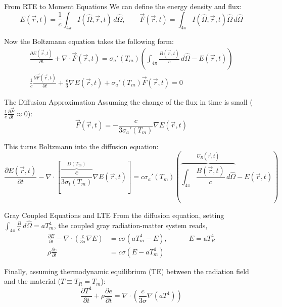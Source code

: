 \documentclass[xcolor=table]{beamer}
\begin{document}
\begin{frame}{From RTE to Moment Equations}
    We can define the energy density and flux:
    \begin{equation*}
        E(\vec{r},t) = \frac{1}{c}\int_{4\pi} I(\hat{\Omega}, \vec{r}, t) \, d\hat{\Omega}, \qquad \vec{F}(\vec{r},t) = \int_{4\pi} I(\hat{\Omega}, \vec{r}, t)\hat{\Omega} \, d\hat{\Omega}
    \end{equation*}

    Now the Boltzmann equation takes the following form:
    \begin{gather*}
        \frac{\partial E(\vec{r},t)}{\partial t} + \nabla \cdot \vec{F}(\vec{r},t) = \sigma_a'(T_m)\left(\int_{4\pi} \frac{B(\vec{r},t)}{c} \, d\hat{\Omega} - E(\vec{r},t)\right) \\[8pt]
        \frac{1}{c}\frac{\partial \vec{F}(\vec{r},t)}{\partial t} + \frac{c}{3} \nabla E(\vec{r},t) + \sigma_a'(T_m)\vec{F}(\vec{r},t) = 0
    \end{gather*}
\end{frame}

\begin{frame}{The Diffusion Approximation}
    Assuming the change of the flux in time is small ($\frac{1}{c}\frac{\partial \vec{F}}{\partial t} \approx 0$):
    \begin{equation*}
        \vec{F}(\vec{r},t) = -\frac{c}{3\sigma_a'(T_m)} \nabla E(\vec{r},t)
    \end{equation*}

    \vspace{0.3cm}
    This turns Boltzmann into the diffusion equation:
    \begin{equation*}
        \frac{\partial E(\vec{r},t)}{\partial t} - \nabla \cdot \left[\overbrace{\frac{c}{3\sigma_t(T_m)}}^{D(T_m)} \nabla E(\vec{r},t)\right] = c\sigma_a'(T_m)\left(\overbrace{\int_{4\pi} \frac{B(\vec{r},t)}{c} \, d\hat{\Omega}}^{U_R(\vec{r},t)} - E(\vec{r},t)\right)
    \end{equation*}
\end{frame}

\begin{frame}{Gray Coupled Equations and LTE}
    From the diffusion equation, setting $\int_{4\pi} \frac{B}{c}\,d\hat{\Omega} = aT_m^4$, the coupled gray radiation-matter system reads,
    \begin{align*}
        \frac{\partial E}{\partial t} - \nabla \cdot \left(\frac{c}{3\sigma} \nabla E\right) &= c\sigma(aT_m^4 - E), \quad \quad \quad E = \mathrm{a} T_R^4 \\
        \rho \frac{\partial e}{\partial t} &= c\sigma(E - aT_m^4)
    \end{align*}

    Finally, assuming thermodynamic equilibrium (TE) between the radiation field and the material ($T \equiv T_R = T_m$):
    \begin{equation}
        \frac{\partial T^4}{\partial t} + \rho \frac{\partial e}{\partial t} = \nabla \cdot \left(\frac{c}{3\sigma} \nabla (aT^4)\right)
    \end{equation}

\end{frame}
\end{document}
